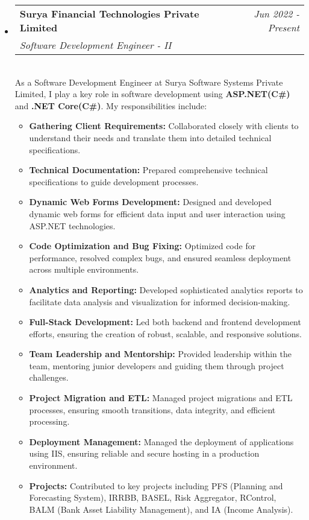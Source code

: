 \documentclass[a4paper,12pt]{article}
\makeatletter
\newcommand{\resumeSubHeadingListStart}{\begin{itemize}[leftmargin=*,labelsep=1mm,noitemsep]}
\newcommand{\resumeSubHeadingListEnd}{\end{itemize}\vspace{2mm}}
\newcommand{\resumeItemListStart}{\begin{itemize}[leftmargin=3ex, rightmargin=2ex, noitemsep,labelsep=1.2mm,itemsep=0mm]\small}
\newcommand{\resumeItemListEnd}{\end{itemize}\vspace{-2mm}}
\newcommand{\resumeExperience}[4]{
\vspace{0.5mm}\item
    \begin{tabular*}{0.98\textwidth}[t]{l@{\extracolsep{\fill}}r}
        \textbf{#1} & \textit{\footnotesize{#3}}\\
        \textit{\footnotesize{#2}} & {}
    \end{tabular*}\\ [1mm]
    \footnotesize{#4}
}
\newcommand{\emptyLine}{\\[-3mm]}
\makeatother
\begin{document}
\resumeSubHeadingListStart
\resumeExperience {Surya Financial Technologies Private Limited}
 {Software Development Engineer - II} {Jun 2022 - Present}
{
As a Software Development Engineer at Surya Software Systems Private Limited, I play a key role in software development using \textbf{ASP.NET(C\#)} and \textbf{.NET Core(C\#)}. My responsibilities include:
}\emptyLine
\resumeItemListStart
    \item \textbf{Gathering Client Requirements:} Collaborated closely with clients to understand their needs and translate them into detailed technical specifications.
    \item \textbf{Technical Documentation:} Prepared comprehensive technical specifications to guide development processes.
    \item \textbf{Dynamic Web Forms Development:} Designed and developed dynamic web forms for efficient data input and user interaction using ASP.NET technologies.
    \item \textbf{Code Optimization and Bug Fixing:} Optimized code for performance, resolved complex bugs, and ensured seamless deployment across multiple environments.
    \item \textbf{Analytics and Reporting:} Developed sophisticated analytics reports to facilitate data analysis and visualization for informed decision-making.
    \item \textbf{Full-Stack Development:} Led both backend and frontend development efforts, ensuring the creation of robust, scalable, and responsive solutions.
    \item \textbf{Team Leadership and Mentorship:} Provided leadership within the team, mentoring junior developers and guiding them through project challenges.
    \item \textbf{Project Migration and ETL:} Managed project migrations and ETL processes, ensuring smooth transitions, data integrity, and efficient processing.
    \item \textbf{Deployment Management:} Managed the deployment of applications using IIS, ensuring reliable and secure hosting in a production environment.
    \item \textbf{Projects:} Contributed to key projects including PFS (Planning and Forecasting System), IRRBB, BASEL, Risk Aggregator, RControl, BALM (Bank Asset Liability Management), and IA (Income Analysis).
    \resumeItemListEnd
\resumeSubHeadingListEnd
\end{document}
